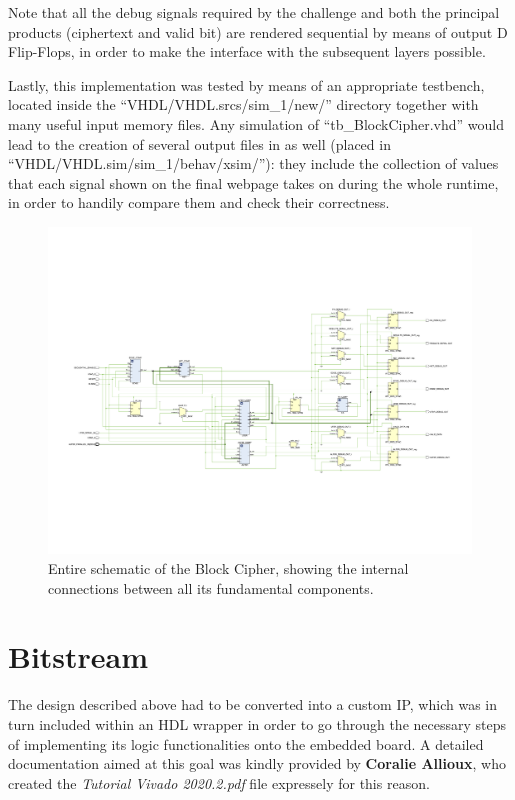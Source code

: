 Note that all the debug signals required by the challenge and both the principal products (ciphertext and valid bit) are rendered sequential by means of output D Flip-Flops, in order to make the interface with the subsequent layers possible.

Lastly, this implementation was tested by means of an appropriate testbench, located inside the ``VHDL/VHDL.srcs/sim\_1/new/'' directory together with many useful input memory files.
Any simulation of ``tb\_BlockCipher.vhd'' would lead to the creation of several output files in as well (placed in ``VHDL/VHDL.sim/sim\_1/behav/xsim/''): they include the collection of values that each signal shown on the final webpage takes on during the whole runtime, in order to handily compare them and check their correctness.
\begin{figure}[!ht]
\vspace{0.5cm}
\includegraphics[width=\textwidth]{images/top_level.png}
\caption{Entire schematic of the Block Cipher, showing the internal connections between all its fundamental components.}
\end{figure}
\section{Bitstream}
\label{bitstream}
The design described above had to be converted into a custom IP, which was in turn included within an HDL wrapper in order to go through the necessary steps of implementing its logic functionalities onto the embedded board.
A detailed documentation aimed at this goal was kindly provided by \textbf{Coralie Allioux}, who created the \emph{Tutorial Vivado 2020.2.pdf} file expressely for this reason.

